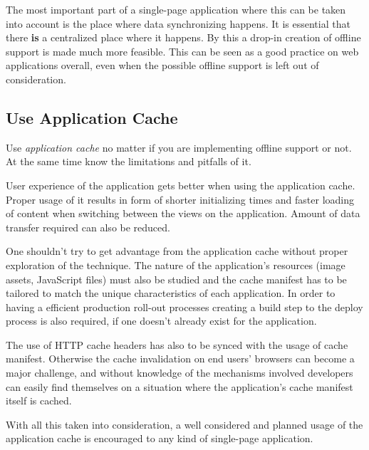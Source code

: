 The most important part of a single-page application where this can be taken into account is the place where data synchronizing happens. It is essential that there \textbf{is} a centralized place where it happens. By this a drop-in creation of offline support is made much more feasible. This can be seen as a good practice on web applications overall, even when the possible offline support is left out of consideration. 






\subsection{Use Application Cache}


Use \textit{application cache} no matter if you are implementing offline support or not. At the same time know the limitations and pitfalls of it.

User experience of the application gets better when using the application cache. Proper usage of it results in form of shorter initializing times and faster loading of content when switching between the views on the application. Amount of data transfer required can also be reduced. 

One shouldn't try to get advantage from the application cache without proper exploration of the technique. The nature of the application's resources (image assets, JavaScript files) must also be studied and the cache manifest has to be tailored to match the unique characteristics of each application. In order to having a efficient production roll-out processes creating a build step to the deploy process is also required, if one doesn't already exist for the application.

The use of HTTP cache headers has also to be synced with the usage of cache manifest. Otherwise the cache invalidation on end users' browsers can become a major challenge, and without knowledge of the mechanisms involved developers can easily find themselves on a situation where the application's cache manifest itself is cached. 

With all this taken into consideration, a well considered and planned usage of the application cache is encouraged to any kind of single-page application.








